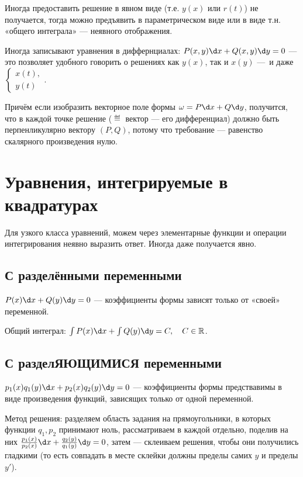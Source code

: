 \documentclass[12pt, a4paper]{article}
\begin{document}
Иногда предоставить решение в явном виде (т.е. $y(x)$ или $r(t)$)
не получается, тогда можно предъявить в параметрическом виде или
в виде т.н. «общего интеграла» — неявного отображения.

Иногда записывают уравнения в диффернциалах: $P(x, y) \d x + Q(x, y) \d y = 0$ — это позволяет удобного говорить
о решениях как $y(x)$, так и $x(y)$ — и даже $\begin{cases}
    x(t), \\
    y(t)
\end{cases}$.

Причём если изобразить векторное поле формы $\omega = P \d x + Q \d y$,
получится, что в каждой точке решение ($\eqdef$ вектор — его дифференциал) 
должно быть перпенликулярно вектору $(P, Q)$, 
потому что требование — равенство скалярного произведения нулю.



\section{Уравнения, интегрируемые в квадратурах}

Для узкого класса уравнений, можем через элементарные функции 
и операции интегрирования неявно выразить ответ. 
Иногда даже получается явно.

\subsection{С разделёнными переменными}

$P(x) \d x + Q(y) \d y = 0$ — коэффициенты формы зависят только от «своей» переменной.

Общий интеграл: $\int P(x) \d x + \int Q(y) \d y = C, \quad C \in \sR$.

\subsection{С разделЯЮЩИМИСЯ переменными}

$p_1(x) q_1(y) \d x + p_2(x) q_2(y) \d y = 0$ — коэффициенты формы предствавимы в виде произведения функций, зависящих только от одной переменной.

Метод решения: разделяем область задания на прямоугольники, в которых функции $q_1, p_2$ принимают ноль,
рассматриваем в каждой отдельно, поделив на них $\frac{p_1(x)}{ p_2(x)} \d x + \frac{q_2(y)}{q_1(y)} \d y = 0$,
затем — склеиваем решения, чтобы они получились гладкими (то есть совпадать в месте склейки должны пределы самих $y$ и пределы $y'$).
\end{document}
